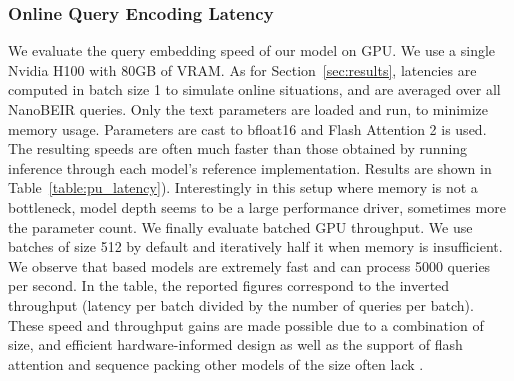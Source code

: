 \subsubsection{Online Query Encoding Latency}
\label{appendix:gpu_latency}
We evaluate the query embedding speed of our model on GPU. We use a single Nvidia H100 with 80GB of VRAM. As for Section~\ref{sec:results}, latencies are computed in batch size 1 to simulate online situations, and are averaged over all NanoBEIR queries. Only the text parameters are loaded and run, to minimize memory usage. Parameters are cast to bfloat16 and Flash Attention 2 is used. The resulting speeds are often much faster than those obtained by running inference through each model's reference implementation. Results are shown in Table~\ref{table:pu_latency}). Interestingly in this setup where memory is not a bottleneck, model depth seems to be a large performance driver, sometimes more the parameter count.
We finally evaluate batched GPU throughput. We use batches of size 512 by default and iteratively half it when memory is insufficient. We observe that \flagship{} based models are extremely fast and can process 5000 queries per second. In the table, the reported figures correspond to the inverted throughput (latency per batch divided by the number of queries per batch). These speed and throughput gains are made possible due to a combination of size, and efficient hardware-informed design as well as the support of flash attention and sequence packing other models of the size often lack .






\clearpage

